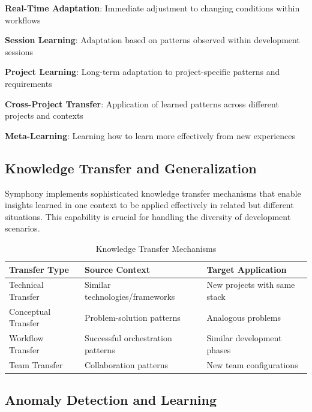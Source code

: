 \begin{expandedlist}
    \item \textbf{Real-Time Adaptation}: Immediate adjustment to changing conditions within workflows
    \item \textbf{Session Learning}: Adaptation based on patterns observed within development sessions
    \item \textbf{Project Learning}: Long-term adaptation to project-specific patterns and requirements
    \item \textbf{Cross-Project Transfer}: Application of learned patterns across different projects and contexts
    \item \textbf{Meta-Learning}: Learning how to learn more effectively from new experiences
\end{expandedlist}

\subsection*{Knowledge Transfer and Generalization}

Symphony implements sophisticated knowledge transfer mechanisms that enable insights learned in one context to be applied effectively in related but different situations. This capability is crucial for handling the diversity of development scenarios.

\begin{table}[ht]
\centering
\begin{tabular}{@{}lll@{}}
\toprule
\textbf{Transfer Type} & \textbf{Source Context} & \textbf{Target Application} \\
\midrule
Technical Transfer & Similar technologies/frameworks & New projects with same stack \\
Conceptual Transfer & Problem-solution patterns & Analogous problems \\
Workflow Transfer & Successful orchestration patterns & Similar development phases \\
Team Transfer & Collaboration patterns & New team configurations \\
\bottomrule
\end{tabular}
\caption{Knowledge Transfer Mechanisms}
\end{table}

\subsection*{Anomaly Detection and Learning}

